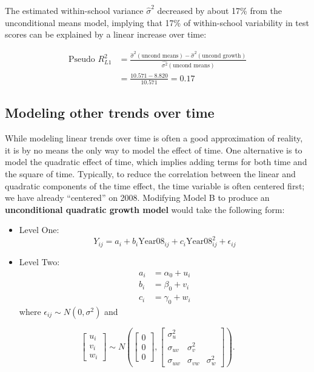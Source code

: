 \documentclass[
]{krantz}
\begin{document}
The estimated within-school variance \(\hat{\sigma}^2\) decreased by about 17\% from the unconditional means model, implying that 17\% of within-school variability in test scores can be explained by a linear increase over time:

\begin{align*}
\textrm{Pseudo }R^2_{L1} & = \frac{\hat{\sigma}^2(\textrm{uncond means}) - \hat{\sigma}^2(\textrm{uncond growth})}{\hat{\sigma^2}(\textrm{uncond means})} \\
 & = \frac{10.571-8.820}{10.571}= 0.17
\end{align*}

\hypertarget{othertimetrends}{%
\subsection{Modeling other trends over time}\label{othertimetrends}}

While modeling linear trends over time is often a good approximation of reality, it is by no means the only way to model the effect of time. One alternative is to model the quadratic effect of time, which implies adding terms for both time and the square of time. Typically, to reduce the correlation between the linear and quadratic components of the time effect, the time variable is often centered first; we have already ``centered'' on 2008. Modifying Model B to produce an \textbf{unconditional quadratic growth model} would take the following form:

\begin{itemize}
\item
  Level One:
  \begin{equation*}
  Y_{ij}=a_{i}+b_{i}\textrm{Year08}_{ij}+c_{i}\textrm{Year08}^{2}_{ij} + \epsilon_{ij}
  \end{equation*}
\item
  Level Two:
  \begin{align*}
  a_{i} & = \alpha_{0} + u_{i}\\
  b_{i} & = \beta_{0} + v_{i}\\
  c_{i} & = \gamma_{0} + w_{i}
  \end{align*}
  where \(\epsilon_{ij}\sim N(0,\sigma^2)\) and
\end{itemize}

\[ \left[ \begin{array}{c}
            u_{i} \\ v_{i} \\ w_{i}
          \end{array}  \right] \sim N \left( \left[
          \begin{array}{c}
            0 \\ 0 \\ 0
          \end{array} \right], \left[
          \begin{array}{ccc}
            \sigma_{u}^{2} & & \\
            \sigma_{uv} & \sigma_{v}^{2} & \\
            \sigma_{uw} & \sigma_{vw} & \sigma_{w}^{2}
          \end{array} \right] \right) . \]
\end{document}
